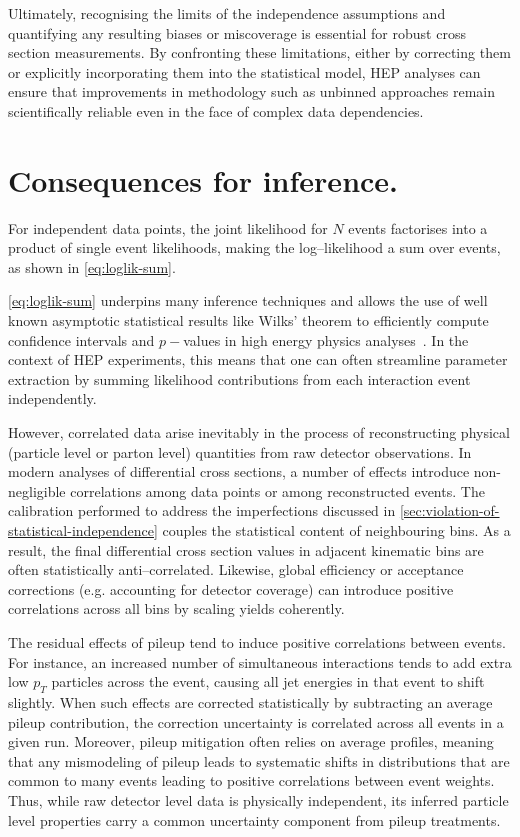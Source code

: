     Ultimately, recognising the limits of the independence assumptions and quantifying any resulting biases or miscoverage is essential for robust cross section measurements.
    By confronting these limitations, either by correcting them or explicitly incorporating them into the statistical model, HEP analyses can ensure that improvements in methodology such as unbinned approaches remain scientifically reliable even in the face of complex data dependencies.
    
\section{Consequences for inference.}
\label{sec:impact}

    For independent data points, the joint likelihood for $N$ events factorises into a product of single event likelihoods, making the log--likelihood a sum over events, as shown in \cref{eq:loglik-sum}.
    
    \cref{eq:loglik-sum} underpins many inference techniques and allows the use of well known asymptotic statistical results like Wilks' theorem to efficiently compute confidence intervals and $p-$values in high energy physics analyses~\cite{Cowan2011AsymptoticPhysics}.
    In the context of HEP experiments, this means that one can often streamline parameter extraction by summing likelihood contributions from each interaction event independently.

    However, correlated data arise inevitably in the process of reconstructing physical (particle level or parton level) quantities from raw detector observations.
    In modern analyses of differential cross sections, a number of effects introduce non-negligible correlations among data points or among reconstructed events.
    The calibration performed to address the imperfections discussed in \cref{sec:violation-of-statistical-independence} couples the statistical content of neighbouring bins.
    As a result, the final differential cross section values in adjacent kinematic bins are often statistically anti--correlated.
    Likewise, global efficiency or acceptance corrections (e.g. accounting for detector coverage) can introduce positive correlations across all bins by scaling yields coherently.

    The residual effects of pileup tend to induce positive correlations between events.
    For instance, an increased number of simultaneous interactions tends to add extra low $p_T$ particles across the event, causing all jet energies in that event to shift slightly.
    When such effects are corrected statistically by subtracting an average pileup contribution, the correction uncertainty is correlated across all events in a given run.
    Moreover, pileup mitigation often relies on average profiles, meaning that any mismodeling of pileup leads to systematic shifts in distributions that are common to many events leading to positive correlations between event weights.
    Thus, while raw detector level data is physically independent, its inferred particle level properties carry a common uncertainty component from pileup treatments.
    
